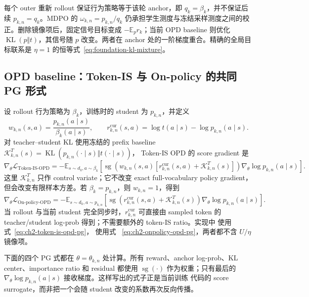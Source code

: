 \documentclass[lang=cn,scheme=chinese,openany]{../book/elegantbook}
\newcommand{\E}{\mathbb E}
\newcommand{\KL}{\operatorname{KL}}
\begin{document}
每个 outer 重新 rollout 保证行为策略等于该轮 anchor，即 $q_k=\beta_k$，并不保证后续 $p_{k,n}=q_k$。MDPO 的 $\omega_{k,n}=p_{k,n}/q_k$ 仍承担学生测度与冻结采样测度之间的校正。删除镜像项后，固定信号目标变成 $-\E_p r_k$；当前 OPD baseline 则优化 $\KL(p\Vert t)$，其信号随 $p$ 改变。两者在 anchor 处的一阶梯度重合。精确的全局目标联系是 $\eta=1$ 的恒等式~\eqref{eq:foundation-kl-mixture}。

\subsection{OPD baseline：Token-IS 与 On-policy 的共同 PG 形式}
\label{subsec:ch2-opd-baselines-in-map}

设 rollout 行为策略为 $\beta_k$，训练时的 student 为 $ p_{k,n}$，并定义
\begin{equation}
\label{eq:ch2-opd-is-pg}
w_{k,n}(s,a)=\frac{ p_{k,n}(a\mid s)}{\beta_k(a\mid s)},
\qquad
r_{k,n}^{\mathrm{cur}}(s,a)=\log t(a\mid s)-\log p_{k,n}(a\mid s).
\end{equation}
对 teacher--student KL 使用冻结的 prefix baseline
$\mathcal K_{k,n}^{T}(s)=\operatorname{KL}( p_{k,n}(\cdot\mid s)\Vert t(\cdot\mid s))$，
Token-IS OPD 的 score gradient 是
\begin{equation}
\label{eq:ch2-token-is-opd-pg}
\nabla_\theta\mathcal L_{\mathrm{Token\text{-}IS\text{-}OPD}}
=-\mathbb E_{s\sim d_k,a\sim\beta_k}
\left[\operatorname{sg}\!\left(w_{k,n}(s,a)[r_{k,n}^{\mathrm{cur}}(s,a)+\mathcal K_{k,n}^{T}(s)]\right)
\nabla_\theta\log p_{k,n}(a\mid s)\right].
\end{equation}
这里 $\mathcal K_{k,n}^{T}$ 只作 control variate；它不改变 exact full-vocabulary policy gradient，
但会改变有限样本方差。若 $\beta_k= p_{k,n}$，则 $w_{k,n}=1$，得到
\begin{equation}
\label{eq:ch2-onpolicy-opd-pg}
\nabla_\theta\mathcal L_{\mathrm{On\text{-}policy\text{-}OPD}}
=-\mathbb E_{s\sim d_k,a\sim p_{k,n}}
\left[\operatorname{sg}\!\left(r_{k,n}^{\mathrm{cur}}(s,a)+\mathcal K_{k,n}^{T}(s)\right)
\nabla_\theta\log p_{k,n}(a\mid s)\right].
\end{equation}
当 rollout 与当前 student 完全同步时，$r_{k,n}^{\mathrm{cur}}$ 可直接由 sampled token 的
teacher/student log-prob 得到；不需要额外的 token-IS ratio。实现中
 使用式~\eqref{eq:ch2-token-is-opd-pg}， 使用式
~\eqref{eq:ch2-onpolicy-opd-pg}，两者都不含 $U/\eta$ 镜像项。

下面的四个 PG 式都在 $\theta=\theta_{k,n}$ 处计算。所有 reward、anchor
log-prob、KL center、importance ratio 和 residual 都使用
$\operatorname{sg}(\cdot)$ 作为权重；只有最后的
$\nabla_\theta\log p_{k,n}(a\mid s)$ 接收梯度。这样写出的式子正是当前训练
代码的 score surrogate，而非把一个会随 student 改变的系数再次反向传播。
\end{document}

